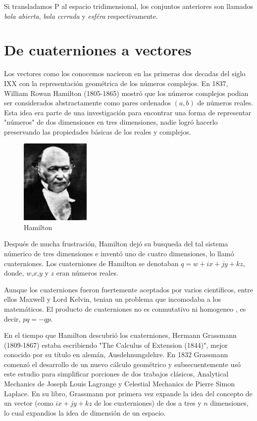 Si transladamos P al espacio tridimensional, los conjuntos anteriores son llamados \emph{bola abierta},
\emph{bola cerrada} y \emph{esféra} respectivamente.

\section{De cuaterniones a vectores}
Los vectores como los conocemos nacieron en las primeras dos decadas del siglo IXX con la representación
geométrica de los números complejos. En 1837, William Rowan Hamilton (1805-1865) mostró que los números
complejos podian ser considerados abstractamente como pares ordenados $(a,b)$ de números reales. Esta idea
era parte de una investigación para encontrar una forma de representar "números" de dos dimensiones en tres
dimensiones, nadie logró hacerlo preservando las propiedades básicas de los reales y complejos. \\

\begin{figure}[!ht]
  \begin{center}
    \includegraphics[width=0.3\textwidth]{gfx/hamilton}
  \end{center}
  \caption{Hamilton}
\end{figure}

Después de mucha frustración, Hamilton dejó su busqueda del tal sistema númerico de tres dimensiones e inventó
uno de cuatro dimensiones, lo llamó cuaterniones. Los cuaterniones de Hamilton se denotaban $q = w + ix + jy + kz$, donde, $w$,$x$,$y$ y $z$ eran números reales.

Aunque los cuaterniones fueron fuertemente aceptados por varios científicos, entre ellos Maxwell y Lord Kelvin,
tenian un problema que incomodaba a los matemáticos. El producto de cuaterniones no es conmutativo ni homogeneo
, es decir, $pq = -qp$.

En el tiempo que Hamilton descubrió los cuaterniones, Hermann Grassmann (1809-1867) estaba escribiendo
"The Calculus of Extension (1844)", mejor conocido por su título en alemán, Ausdehnungslehre. En 1832
Grassmann comenzó el desarrollo de un nuevo cálculo geométrico y subsecuentemente usó este estudio para
simplificar porciones de dos trabajos clásicos, Analytical Mechanics de Joseph Louis Lagrange y Celestial
Mechanics de Pierre Simon Laplace. En su libro, Grassmann por primera vez expande la idea del concepto
de un vector (como $ix + jy + kz$ de los cuaterniones) de dos a tres y $n$ dimensiones, lo cual expandios
la idea de dimensión de un espacio.

